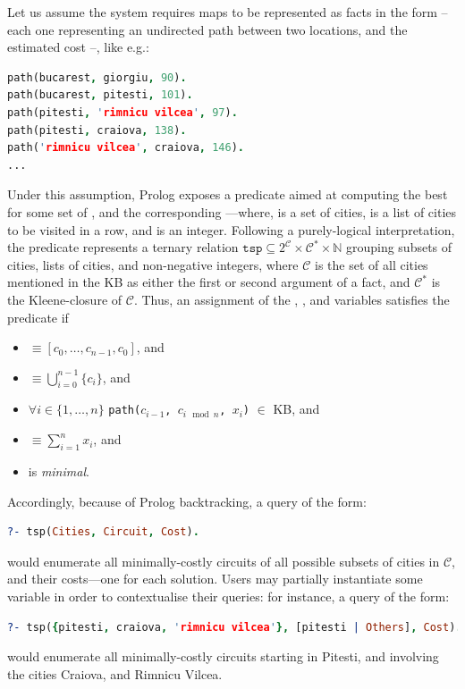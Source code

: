 \documentclass[12pt,a4paper,openright,twoside]{book}
\begin{document}
Let us assume the system requires maps to be represented as facts in the form  -- each one representing an undirected path between two locations, and the estimated cost --, like e.g.:
%
\begin{lstlisting}[language=Prolog]
path(bucarest, giorgiu, 90).
path(bucarest, pitesti, 101).
path(pitesti, 'rimnicu vilcea', 97).
path(pitesti, craiova, 138).
path('rimnicu vilcea', craiova, 146).
...
\end{lstlisting}
%
Under this assumption, Prolog exposes a predicate  aimed at computing the best  for some set of , and the corresponding ---where,  is a set of cities,  is a list of cities to be visited in a row, and  is an integer.
%
Following a purely-logical interpretation, the predicate represents a ternary relation $\texttt{tsp} \subseteq 2^\mathcal{C} \times \mathcal{C}^* \times \mathbb{N}$ grouping subsets of cities, lists of cities, and non-negative integers, where $\mathcal{C}$ is the set of all cities mentioned in the KB as either the first or second argument of a  fact, and $\mathcal{C}^*$ is the Kleene-closure of $\mathcal{C}$.
%
Thus, an assignment of the , , and  variables satisfies the predicate if
%
\begin{itemize}
    \item {} $\equiv [c_0, \ldots, c_{n-1}, c_0]$, and
    \item {} $\equiv \bigcup_{i=0}^{n-1} \{c_i\}$, and
    \item $\forall i \in \{1, \ldots, n\}$ \texttt{path($c_{i-1}$, $c_{i \mod n}$, $x_i$)} $\in$ KB, and
    \item {} $\equiv \sum_{i=1}^{n} x_i$, and
    \item {} is \emph{minimal}.
\end{itemize}
%
Accordingly, because of Prolog backtracking, a query of the form:
%
\begin{lstlisting}[language=Prolog]
?- tsp(Cities, Circuit, Cost).
\end{lstlisting}
%
would enumerate all minimally-costly circuits of all possible subsets of cities in $\mathcal{C}$, and their costs---one for each solution.
%
Users may partially instantiate some variable in order to contextualise their queries: for instance, a query of the form:
%
\begin{lstlisting}[language=Prolog]
?- tsp({pitesti, craiova, 'rimnicu vilcea'}, [pitesti | Others], Cost).
\end{lstlisting}
%
would enumerate all minimally-costly circuits starting in Pitesti, and involving the cities Craiova, and Rimnicu Vilcea.
\end{document}
